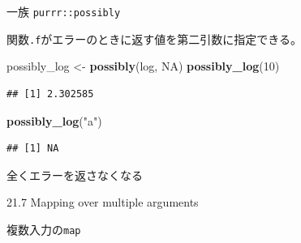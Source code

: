 \documentclass[ignorenonframetext,]{beamer}
\newenvironment{Shaded}{\begin{snugshade}}{\end{snugshade}}
\newcommand{\KeywordTok}[1]{\textcolor[rgb]{0.13,0.29,0.53}{\textbf{#1}}}
\newcommand{\DecValTok}[1]{\textcolor[rgb]{0.00,0.00,0.81}{#1}}
\newcommand{\StringTok}[1]{\textcolor[rgb]{0.31,0.60,0.02}{#1}}
\newcommand{\OtherTok}[1]{\textcolor[rgb]{0.56,0.35,0.01}{#1}}
\newcommand{\NormalTok}[1]{#1}
\begin{document}
\begin{frame}[fragile]{一族 \texttt{purrr::possibly}}

関数\texttt{.f}がエラーのときに返す値を第二引数に指定できる。

\begin{Shaded}
\begin{Highlighting}[]
\NormalTok{possibly_log <-}\StringTok{ }\KeywordTok{possibly}\NormalTok{(log, }\OtherTok{NA}\NormalTok{)}
\KeywordTok{possibly_log}\NormalTok{(}\DecValTok{10}\NormalTok{)}
\end{Highlighting}
\end{Shaded}

\begin{verbatim}
## [1] 2.302585
\end{verbatim}

\begin{Shaded}
\begin{Highlighting}[]
\KeywordTok{possibly_log}\NormalTok{(}\StringTok{"a"}\NormalTok{)}
\end{Highlighting}
\end{Shaded}

\begin{verbatim}
## [1] NA
\end{verbatim}

全くエラーを返さなくなる

\end{frame}

\begin{frame}[fragile]{21.7 Mapping over multiple arguments}

複数入力の\texttt{map}

\end{frame}
\end{document}
